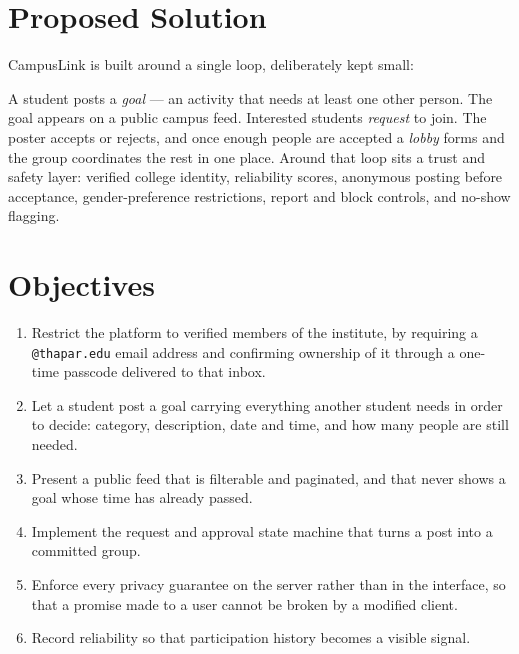 \documentclass[twoside,12pt]{tietreport}
\begin{document}
\section{Proposed Solution}

CampusLink is built around a single loop, deliberately kept small:

\begin{center}
\end{center}

A student posts a \emph{goal} — an activity that needs at least one other person.
The goal appears on a public campus feed. Interested students \emph{request} to
join. The poster accepts or rejects, and once enough people are accepted a
\emph{lobby} forms and the group coordinates the rest in one place. Around that
loop sits a trust and safety layer: verified college identity, reliability
scores, anonymous posting before acceptance, gender-preference restrictions,
report and block controls, and no-show flagging.

\section{Objectives}

\begin{enumerate}[leftmargin=*]
  \item Restrict the platform to verified members of the institute, by requiring
    a \texttt{@thapar.edu} email address and confirming ownership of it through a
    one-time passcode delivered to that inbox.
  \item Let a student post a goal carrying everything another student needs in
    order to decide: category, description, date and time, and how many people
    are still needed.
  \item Present a public feed that is filterable and paginated, and that never
    shows a goal whose time has already passed.
  \item Implement the request and approval state machine that turns a post into a
    committed group.
  \item Enforce every privacy guarantee on the server rather than in the
    interface, so that a promise made to a user cannot be broken by a modified
    client.
  \item Record reliability so that participation history becomes a visible signal.
\end{enumerate}
\end{document}

